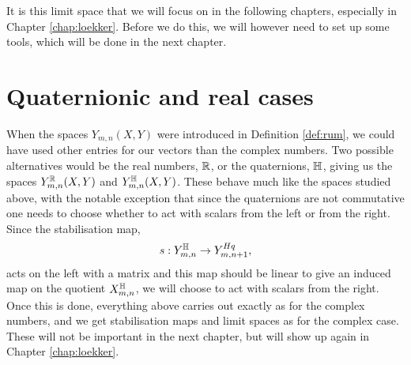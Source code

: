 It is this limit space that we will focus on in the following
chapters, especially in Chapter \ref{chap:loekker}. Before we do this,
we will however need to set up some tools, which will be done in the
next chapter.

\section{Quaternionic and real cases}
\label{sec:koeff}

When the spaces $Y_{m,n}(X,Y)$ were introduced in Definition
\ref{def:rum}, we could have used other entries for our vectors than
the complex numbers. Two possible alternatives would be the real
numbers, $\mathbb{R}$, or the quaternions, $\mathbb{H}$, giving us the spaces
$Y^{\mathbb{R}}_{m,n}(X,Y)$ and $Y^{\mathbb{H}}_{m,n}(X,Y)$. These behave much like
the spaces studied above, with the notable exception that since the
quaternions are not commutative one needs to choose whether to act
with scalars from the left or from the right. Since the stabilisation
map,
\[ s : Y_{m,n}^{\mathbb{H}} \to Y_{m,n+1}^{Hq}, \]
acts on the left with a matrix and this map should be linear to give
an induced map on the quotient $X^{\mathbb{H}}_{m,n}$, we will choose to act
with scalars from the right. Once this is done, everything above
carries out exactly as for the complex numbers, and we get
stabilisation maps and limit spaces as for the complex
case. These will not be important in the next chapter, but will show
up again in Chapter \ref{chap:loekker}.


